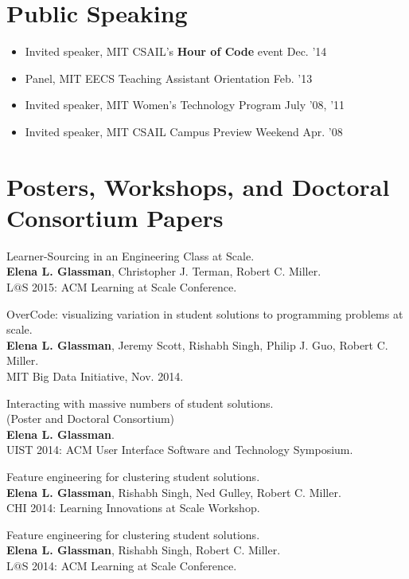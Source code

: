\documentclass[margin]{res}
\begin{document}
\begin{resume}
\section{Public Speaking}
\begin{itemize}[leftmargin=*] \itemsep -2pt 
\item Invited speaker, MIT CSAIL's {\bf Hour of Code} event \hfill Dec. '14
\item Panel, MIT EECS Teaching Assistant Orientation \hfill Feb. '13
\item Invited speaker, MIT Women's Technology Program \hfill July '08, '11
\item Invited speaker, MIT CSAIL Campus Preview Weekend \hfill Apr. '08
\end{itemize}

\section{Posters, Workshops, and Doctoral Consortium Papers}

Learner-Sourcing in an Engineering Class at Scale.\\
{\bf Elena L. Glassman}, Christopher J. Terman, Robert C. Miller.\\
L$@$S 2015: ACM Learning at Scale Conference.

OverCode: visualizing variation in student solutions to programming problems at scale.\\
{\bf Elena L. Glassman}, Jeremy Scott, Rishabh Singh, Philip J. Guo, Robert C. Miller. \\ 
MIT Big Data Initiative, Nov. 2014.

Interacting with massive numbers of student solutions.\\ (Poster and Doctoral Consortium)\\
{\bf Elena L. Glassman}.\\ 
UIST 2014: ACM User Interface Software and Technology Symposium.

Feature engineering for clustering student solutions.\\
{\bf Elena L. Glassman}, Rishabh Singh, Ned Gulley, Robert C. Miller.\\
CHI 2014: Learning Innovations at Scale Workshop.

Feature engineering for clustering student solutions.\\ 
{\bf Elena L. Glassman}, Rishabh Singh, Robert C. Miller.\\
L$@$S 2014: ACM Learning at Scale Conference.


\end{resume}
\end{document}
